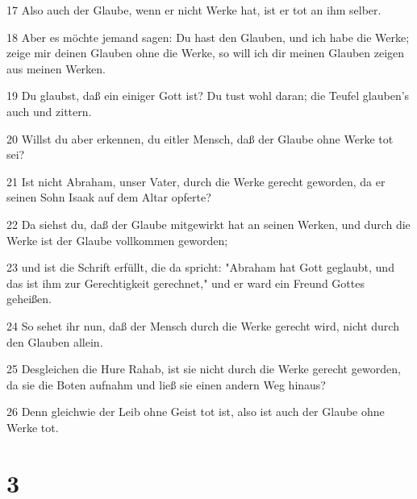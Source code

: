 \par 17 Also auch der Glaube, wenn er nicht Werke hat, ist er tot an ihm selber.
\par 18 Aber es möchte jemand sagen: Du hast den Glauben, und ich habe die Werke; zeige mir deinen Glauben ohne die Werke, so will ich dir meinen Glauben zeigen aus meinen Werken.
\par 19 Du glaubst, daß ein einiger Gott ist? Du tust wohl daran; die Teufel glauben's auch und zittern.
\par 20 Willst du aber erkennen, du eitler Mensch, daß der Glaube ohne Werke tot sei?
\par 21 Ist nicht Abraham, unser Vater, durch die Werke gerecht geworden, da er seinen Sohn Isaak auf dem Altar opferte?
\par 22 Da siehst du, daß der Glaube mitgewirkt hat an seinen Werken, und durch die Werke ist der Glaube vollkommen geworden;
\par 23 und ist die Schrift erfüllt, die da spricht: "Abraham hat Gott geglaubt, und das ist ihm zur Gerechtigkeit gerechnet," und er ward ein Freund Gottes geheißen.
\par 24 So sehet ihr nun, daß der Mensch durch die Werke gerecht wird, nicht durch den Glauben allein.
\par 25 Desgleichen die Hure Rahab, ist sie nicht durch die Werke gerecht geworden, da sie die Boten aufnahm und ließ sie einen andern Weg hinaus?
\par 26 Denn gleichwie der Leib ohne Geist tot ist, also ist auch der Glaube ohne Werke tot.

\chapter{3}

